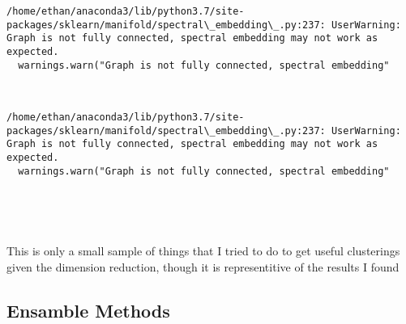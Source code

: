 \documentclass[11pt]{article}
\begin{document}
    \begin{Verbatim}[commandchars=\\\{\}]
/home/ethan/anaconda3/lib/python3.7/site-packages/sklearn/manifold/spectral\_embedding\_.py:237: UserWarning: Graph is not fully connected, spectral embedding may not work as expected.
  warnings.warn("Graph is not fully connected, spectral embedding"

    \end{Verbatim}

    \begin{center}
    \end{center}
    { \hspace*{\fill} \\}
    
    \begin{Verbatim}[commandchars=\\\{\}]
/home/ethan/anaconda3/lib/python3.7/site-packages/sklearn/manifold/spectral\_embedding\_.py:237: UserWarning: Graph is not fully connected, spectral embedding may not work as expected.
  warnings.warn("Graph is not fully connected, spectral embedding"

    \end{Verbatim}

    \begin{center}
    \end{center}
    { \hspace*{\fill} \\}
    
    \begin{center}
    \end{center}
    { \hspace*{\fill} \\}
    
    This is only a small sample of things that I tried to do to get useful
clusterings given the dimension reduction, though it is representitive
of the results I found

    \hypertarget{ensamble-methods}{%
\subsection{Ensamble Methods}\label{ensamble-methods}}
\end{document}

